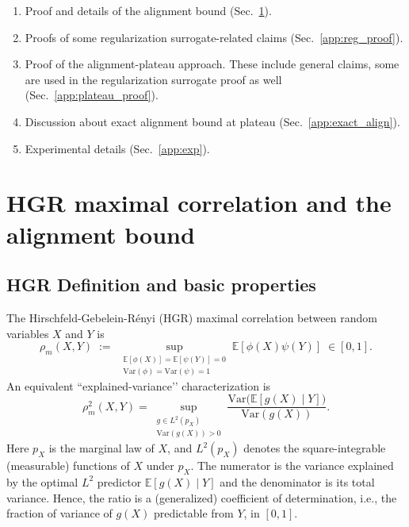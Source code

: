 \documentclass{article}
\newcommand{\E}{\mathbb{E}}
\newcommand{\Var}{\mathrm{Var}}
\begin{document}
\begin{enumerate}[label=\Alph*.]
    \item Proof and details of the alignment bound (Sec.~\ref{app:hgr}).
    \item Proofs of some regularization surrogate-related claims (Sec.~\ref{app:reg_proof}).
    \item Proof of the alignment-plateau approach. These include general claims, some are used in the regularization surrogate proof as well (Sec.~\ref{app:plateau_proof}).
    \item Discussion about exact alignment bound at plateau (Sec.~\ref{app:exact_align}). 
    \item Experimental details (Sec.~\ref{app:exp}). 
\end{enumerate}

\section{HGR maximal correlation and the alignment bound}
\label{app:hgr}

\subsection{HGR Definition and basic properties}
\label{app:hgr:def}
The Hirschfeld-Gebelein-R\'enyi (HGR) maximal correlation \citep{hirschfeld1935connection,gebelein1941statistische,renyi1959measures} between random variables $X$ and $Y$ is
\begin{equation}
\label{eq:hgr-def}
\rho_m(X,Y)\;:=\;\sup_{\substack{\E[\phi(X)]=\E[\psi(Y)]=0\\ \Var(\phi)=\Var(\psi)=1}}
\E[\phi(X)\psi(Y)]\;\in[0,1].
\end{equation}
An equivalent “explained-variance’’ characterization \citep{gebelein1941statistische,renyi1959measures} is
\begin{equation}
\label{eq:hgr-var}
\rho_m^2(X,Y)
=\sup_{\substack{g\in L^2(p_X)\\ \Var(g(X))>0}}
\frac{\Var\!\big(\E[g(X)\mid Y]\big)}{\Var(g(X))}.
\end{equation}
Here $p_X$ is the marginal law of $X$, and $L^2(p_X)$ denotes the square-integrable (measurable) functions of $X$ under $p_X$.
The numerator is the variance explained by the optimal $L^2$ predictor $\E[g(X)\mid Y]$ and the denominator is its total variance. Hence, the ratio is a (generalized) coefficient of determination, i.e., the fraction of variance of $g(X)$ predictable from $Y$, in $[0,1]$.
\end{document}
